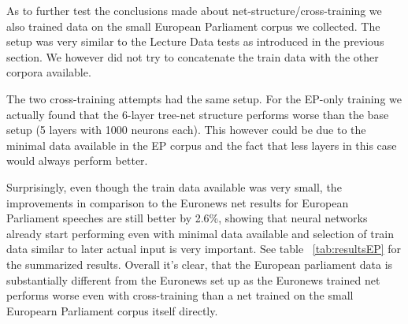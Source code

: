 As to further test the conclusions made about net-structure/cross-training we also trained data on the small European Parliament corpus we collected. The setup was very similar to the Lecture Data tests as introduced in the previous section.  We however did not try to concatenate the train data with the other corpora available.

The two cross-training attempts had the same setup. For the EP-only training we actually found that the 6-layer tree-net structure performs worse than the base setup (5 layers with 1000 neurons each). This however could be due to the minimal data available in the EP corpus and the fact that less layers in this case would always perform better.

Surprisingly, even though the train data available was very small, the improvements in comparison to the Euronews net results for European Parliament speeches are still better by 2.6\%, showing that neural networks already start performing even with minimal data available and selection of train data similar to later actual input is very important. See table ~\ref{tab:resultsEP} for the summarized results. Overall it's clear, that the European parliament data is substantially different from the Euronews set up as the Euronews trained net performs worse even with cross-training than a net trained on the small Europearn Parliament corpus itself directly.


